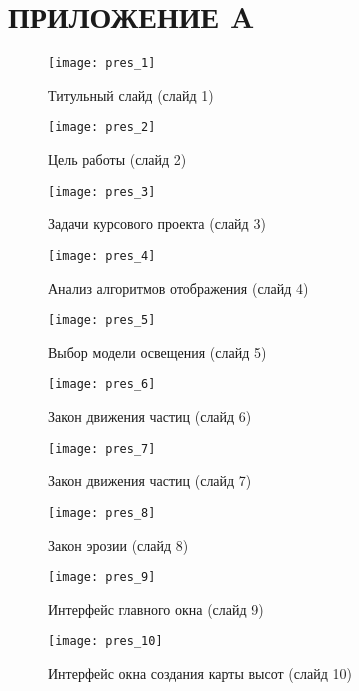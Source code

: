 \chapter*{ПРИЛОЖЕНИЕ A}

\begin{figure}[ht!]\centering
	\texttt{[image: pres\_1]}
	\caption{Титульный слайд (слайд 1)}
\end{figure}

\begin{figure}[ht!]\centering
	\texttt{[image: pres\_2]}
	\caption{Цель работы (слайд 2)}
\end{figure}

\begin{figure}[ht!]\centering
	\texttt{[image: pres\_3]}
	\caption{Задачи курсового проекта (слайд 3)}
\end{figure}

\begin{figure}[ht!]\centering
	\texttt{[image: pres\_4]}
	\caption{Анализ алгоритмов отображения (слайд 4)}
\end{figure}

\begin{figure}[ht!]\centering
	\texttt{[image: pres\_5]}
	\caption{Выбор модели освещения (слайд 5)}
\end{figure}

\begin{figure}[ht!]\centering
	\texttt{[image: pres\_6]}
	\caption{Закон движения частиц (слайд 6)}
\end{figure}

\begin{figure}[ht!]\centering
	\texttt{[image: pres\_7]}
	\caption{Закон движения частиц (слайд 7)}
\end{figure}

\begin{figure}[ht!]\centering
	\texttt{[image: pres\_8]}
	\caption{Закон эрозии (слайд 8)}
\end{figure}

\begin{figure}[ht!]\centering
	\texttt{[image: pres\_9]}
	\caption{Интерфейс главного окна (слайд 9)}
\end{figure}

\begin{figure}[ht!]\centering
	\texttt{[image: pres\_10]}
	\caption{Интерфейс окна создания карты высот (слайд 10)}
\end{figure}

